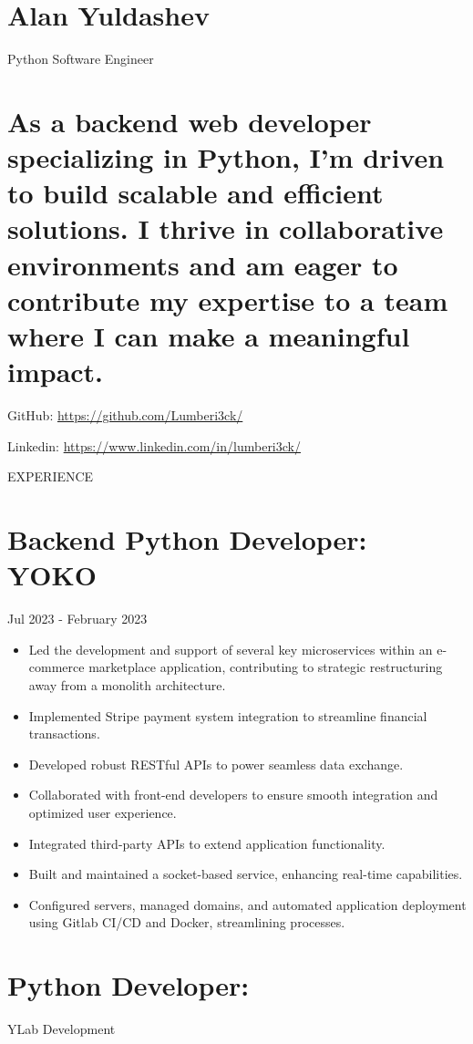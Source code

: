 \documentclass[10pt]{article}
\begin{document}
\section*{Alan Yuldashev}
Python Software Engineer

\section*{As a backend web developer specializing in Python, I'm driven to build scalable and efficient solutions. I thrive in collaborative environments and am eager to contribute my expertise to a team where I can make a meaningful impact.}
GitHub: \href{https://github.com/Lumberi3ck/}{https://github.com/Lumberi3ck/}

Linkedin: \href{https://www.linkedin.com/in/lumberi3ck/}{https://www.linkedin.com/in/lumberi3ck/}

EXPERIENCE

\section*{Backend Python Developer: \\
 YOKO}
Jul 2023 - February 2023

\begin{itemize}
  \item Led the development and support of several key microservices within an e-commerce marketplace application, contributing to strategic restructuring away from a monolith architecture.
  \item Implemented Stripe payment system integration to streamline financial transactions.
  \item Developed robust RESTful APIs to power seamless data exchange.
  \item Collaborated with front-end developers to ensure smooth integration and optimized user experience.
  \item Integrated third-party APIs to extend application functionality.
  \item Built and maintained a socket-based service, enhancing real-time capabilities.
  \item Configured servers, managed domains, and automated application deployment using Gitlab CI/CD and Docker, streamlining processes.
\end{itemize}

\section*{Python Developer:}
YLab Development
\end{document}
